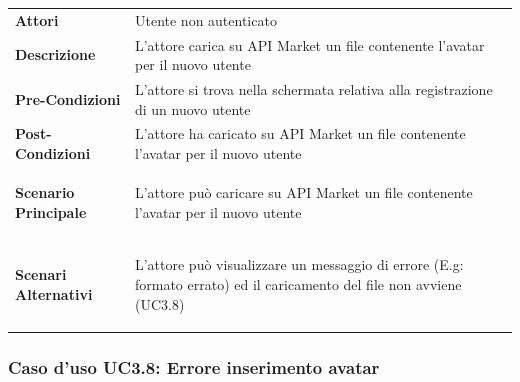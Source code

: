 \begin{minipage}{\linewidth}
	\begin{tabular}{ l | p{11cm}}
		\hline
		\rowcolor{Gray}
		\multicolumn{2}{c}{UC3.7 - Inserimento avatar} \\
		\hline
		\textbf{Attori} & Utente non autenticato \\
		\textbf{Descrizione} & L'attore carica su API Market un file contenente l'avatar per il nuovo utente \\
		\textbf{Pre-Condizioni} & L'attore si trova nella schermata relativa alla registrazione di un nuovo utente \\
		\textbf{Post-Condizioni} & L'attore ha caricato su API Market un file contenente l'avatar per il nuovo utente \\
		\textbf{Scenario Principale} & 
		\begin{enumerate*}[label=(\arabic*.),itemjoin={\newline}]
			\item L'attore può caricare su API Market un file contenente l'avatar per il nuovo utente
		\end{enumerate*}\\
		\textbf{Scenari Alternativi} & 
		\begin{enumerate*}[label=(\arabic*.),itemjoin={\newline}]
		\item L'attore può visualizzare un messaggio di errore (E.g: formato errato) ed il caricamento del file non avviene (UC3.8)
		\end{enumerate*}\\
	\end{tabular}
\end{minipage}

\subsubsection{Caso d'uso UC3.8: Errore inserimento avatar}
\label{UC3_8}

